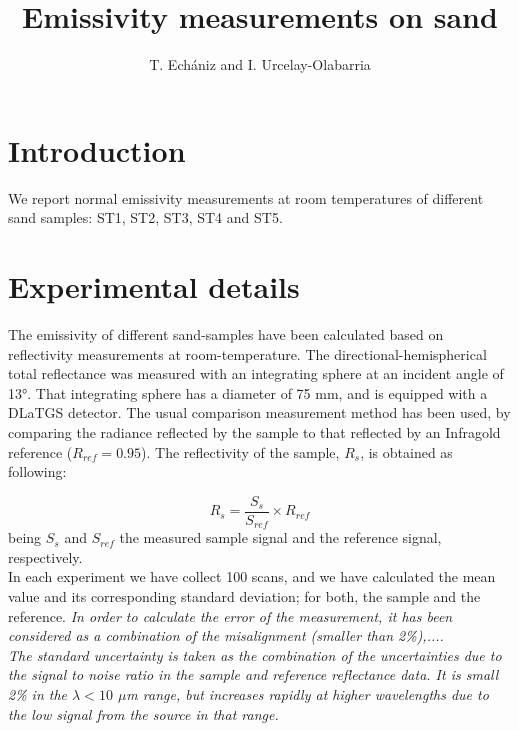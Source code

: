 \documentclass[12pt]{article}
\title{Emissivity measurements on sand}
\author{T. Echániz and I. Urcelay-Olabarria}
\begin{document}
\maketitle


\section{Introduction}

We report normal emissivity measurements at room temperatures of different sand samples: ST1, ST2, ST3, ST4 and ST5.



\section{Experimental details}

The emissivity of different sand-samples have been calculated based on reflectivity measurements at room-temperature. The directional-hemispherical total reflectance was measured with an integrating sphere at an incident angle of 13°. That integrating sphere has a diameter of 75 mm, and is equipped with a DLaTGS detector. The usual comparison measurement method has been used, by comparing the radiance reflected by the sample to that reflected by an Infragold reference ($R_{ref}=0.95$). The reflectivity of the sample, $R_s$, is obtained as following:

\begin{equation}
    R_s = \frac{S_s}{S_{ref}}\times R_{ref}
\end{equation}
being $S_s$ and $S_{ref}$ the measured sample signal and the reference signal, respectively.\\

In each experiment we have collect 100 scans, and we have calculated the mean value and its corresponding standard deviation; for both, the sample and the reference. \textit{In order to calculate the error of the measurement, it has been considered as a combination of the misalignment (smaller than 2\%),....} \\

\textit{The standard uncertainty is taken as the combination of the uncertainties due to the signal to noise ratio in the sample and reference reflectance data. It is small 2\% in the $\lambda < 10$ $\mu$m range, but increases rapidly at higher wavelengths due to the low signal from the source in that range.} \\%
\end{document}
